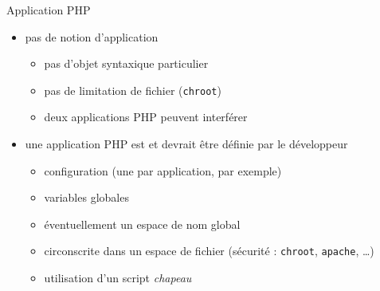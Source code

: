 \begin{frame}{Application PHP}
	\begin{itemize}
		\item pas de notion d'application
		\begin{itemize}
			\item pas d'objet syntaxique particulier
			\item pas de limitation de fichier (\texttt{chroot})
			\item deux applications PHP peuvent interférer
		\end{itemize}
		\item une application PHP est et devrait être définie par le développeur
		\begin{itemize}
			\item configuration (une par application, par exemple)
			\item variables globales
			\item éventuellement un espace de nom global
			\item circonscrite dans un espace de fichier (sécurité : \texttt{chroot}, \texttt{apache}, \ldots)
			\item utilisation d'un script \emph{chapeau}
		\end{itemize}
	\end{itemize}
\end{frame}


